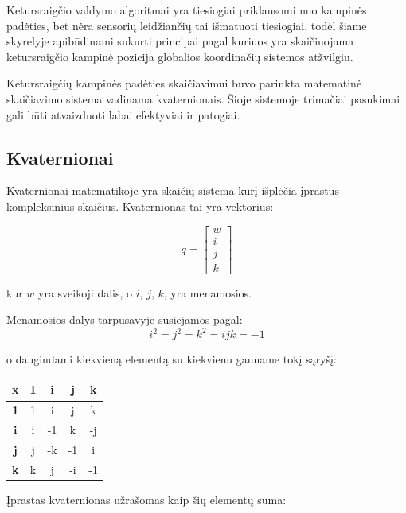 \documentclass[12pt, a4paper, lithuanian, final]{article}
\begin{document}
Ketursraigčio valdymo algoritmai yra tiesiogiai priklausomi nuo kampinės padėties, bet nėra sensorių leidžiančių tai išmatuoti tiesiogiai, todėl šiame skyrelyje apibūdinami sukurti principai pagal kuriuos yra skaičiuojama ketursraigčio kampinė pozicija globalios koordinačių sistemos atžvilgiu.

Ketursraigčių kampinės padėties skaičiavimui buvo parinkta matematinė skaičiavimo sistema vadinama kvaternionais.
Šioje sistemoje trimačiai pasukimai gali būti atvaizduoti labai efektyviai ir patogiai.

\subsection{Kvaternionai}

Kvaternionai matematikoje yra skaičių sistema kurį išplėčia įprastus kompleksinius skaičius.
Kvaternionas tai yra vektorius:

\begin{equation}
	q = \left[
		\begin{array}{c}
			w \\
			i \\
			j \\
			k
		\end{array}
	\right]
\end{equation}

kur $w$ yra sveikoji dalis, o $i$, $j$, $k$, yra menamosios.


Menamosios dalys tarpusavyje susiejamos pagal:
\begin{equation}
	i^2 = j^2 = k^2 = ijk = -1
\end{equation}

o daugindami kiekvieną elementą su kiekvienu gauname tokį sąryšį:

\begin{center}
\begin{tabular}{ | c | c | c | c | c | }
	\hline
	\textbf{x} & \textbf{1} & \textbf{i} & \textbf{j} & \textbf{k} \\
	\hline
	\textbf{1} & 1 & i & j & k \\
	\hline
	\textbf{i} & i & -1 & k & -j \\
	\hline
	\textbf{j} & j & -k & -1 & i \\
	\hline
	\textbf{k} & k & j & -i & -1 \\
	\hline
\end{tabular}
\end{center}

Įprastas kvaternionas užrašomas kaip šių elementų suma:
\end{document}

